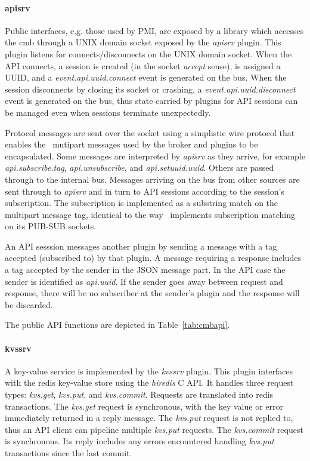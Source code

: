 \paragraph{apisrv}
Public interfaces, e.g. those used by PMI, are exposed by a library which
accesses the cmb through a UNIX domain socket exposed by the {\em apisrv}
plugin.   This plugin listens for connects/disconnects on the UNIX domain
socket.  When the API connects, a session is created (in the socket
{\em accept} sense), is assigned a UUID,
and a {\em event.api.uuid.connect} event is generated on the bus.
When the session disconnects by closing its socket or crashing, a
{\em event.api.uuid.disconnect} event is generated on the bus, thus
state carried by plugins for API sessions can be managed even when
sessions terminate unexpectedly.

Protocol messages are sent over the socket using a simplistic wire protocol
that enables the \zMQ\ mutipart messages used by the broker and plugins to
be encapsulated.  Some messages are interpreted by {\em apisrv} as they
arrive, for example {\em api.subscribe.tag}, {\em api.unsubscribe},
and {\em api.setuuid.uuid}.  Others are passed through to the internal
bus.  Messages arriving on the bus from other sources are sent through to
{\em apisrv} and in turn to API sessions according to the session's
subscription.  The subscription is implemented as a substring match
on the multipart message tag, identical to the way \zMQ\ implements
subscription matching on its PUB-SUB sockets.

An API sesssion messages another plugin by sending a message with a
tag accepted (subscribed to) by that plugin.
A message requiring a response includes a tag accepted by the sender
in the JSON message part.  In the API case the sender is identified as
{\em api.uuid}.  If the sender goes away between request and response,
there will be no subscriber at the sender's plugin and the response
will be discarded.

The public API functions are depicted in Table~\ref{tab:cmbapi}.

\paragraph{kvssrv}
A key-value service is implemented by the {\em kvssrv} plugin.
This plugin interfaces with the redis key-value store using the
{\em hiredis} C API.  It handles three request types: {\em kvs.get},
{\em kvs.put}, and {\em kvs.commit}.  Requests are translated into
redis transactions.  The {\em kvs.get} request is synchronous,
with the key value or error immediately returned in a reply message.
The {\em kvs.put} request is not replied to, thus an API client can
pipeline multiple {\em kvs.put} requests.
The {\em kvs.commit} request is synchronous.  Its reply includes
any errors encountered handling {\em kvs.put} transactions since the
last commit.


